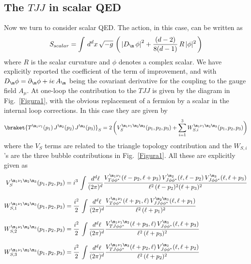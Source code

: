 \documentclass[a4paper,11pt,openright,twoside]{book}
\let\n=\nu      \let\x=\xi     \let\p=\pi      \let\r=\rho
\newcommand{\figref}[1]{Fig.~\ref{#1}}			%
\numberwithin{equation}{section}
\begin{document}
{{\subsection{The $TJJ$ in scalar QED}
Now we turn to consider scalar QED. The action, in this case, can be written as
\begin{equation}
	S_{scalar}=\int\,d^dx\,\sqrt{-g}\,\left(\,\left|D_\m\,\phi\right|^2+\frac{(d-2)}{8(d-1)}\,R\,|\phi|^2\,\right)
\end{equation}
where $R$ is the scalar curvature and $\phi$ denotes a complex scalar. We have explicitly reported the coefficient of the term of improvement, and with $D_\m\phi=\partial_\m\phi+ie\,A_\m$ being the covariant derivative for the coupling to the gauge field $A_\mu$. 
At one-loop the contribution to the $TJJ$ is given by the diagram in \figref{Figura1}, with the obvious replacement of a fermion by a scalar in the internal loop corrections. In this case they are given by 
\begin{equation}
	\braket{T^{\m_1\n_1}(p_1)\,J^{\m_2}(p_2)\,J^{\m_3}(p_3)}_S=2\,\bigg(V_{S}^{\m_1\n_1\m_2\m_3}(p_1,p_2,p_3)+\sum_{i=1}^{3}W_{S,i}^{\m_1\n_1\m_2\m_3}(p_1,p_2,p_3)\bigg)
\end{equation}
where the $V_S$ terms are related to the triangle topology contribution and the $W_{S,i}$'s  are the three bubble contributions in \figref{Figura1}. All these are explicitly given as
\begin{align}
	V_{S}^{\m_1\n_1\m_2\m_3}(p_1,p_2,p_3)&=i^3\,\int\frac{d^d\ell}{(2\p)^d}\frac{V^{\m_1\n_1}_{T\phi\phi^*}(\ell-p_2,\ell+p_3)\,V^{\m_2}_{J\phi\phi^*}(\ell,\ell-p_2)\,V^{\m_3}_{J\phi\phi^*}(\ell,\ell+p_3)}{\ell^2\,(\ell-p_2)^2(\ell+p_3)^2}\\[1.5ex]
	W_{S,1}^{\m_1\n_1\m_2\m_3}(p_1,p_2,p_3)&=\frac{i^2}{2}\,\int\frac{d^d\ell}{(2\p)^d}\frac{V^{\m_1\n_1}_{T\phi\phi^*}(\ell+p_1,\ell)\,V^{\m_2\m_3}_{JJ\phi\phi^*}(\ell,\ell+p_1)}{\ell^2\,(\ell+p_1)^2}\\[1.5ex]
	W_{S,2}^{\m_1\n_1\m_2\m_3}(p_1,p_2,p_3)&=\frac{i^2}{2}\,\int\frac{d^d\ell}{(2\p)^d}\frac{V^{\m_1\n_1\m_2}_{TJ\phi\phi^*}(\ell+p_3,\ell)\,V^{\m_3}_{J\phi\phi^*}(\ell,\ell+p_3)}{\ell^2\,(\ell+p_3)^2}\\[1.5ex]
	W_{S,3}^{\m_1\n_1\m_2\m_3}(p_1,p_2,p_3)&=\frac{i^2}{2}\,\int\frac{d^d\ell}{(2\p)^d}\frac{V^{\m_1\n_1\m_3}_{TJ\phi\phi^*}(\ell+p_2,\ell)\,V^{\m_2}_{J\phi\phi^*}(\ell,\ell+p_2)}{\ell^2\,(\ell+p_2)^2}
\end{align}
}}
\end{document}
